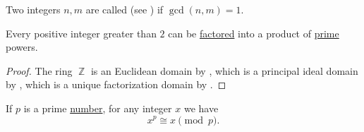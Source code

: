 \begin{definition}\label{def:coprime_numbers}
  Two integers \( n, m \) are called  (see ) if \( \gcd(n, m) = 1 \).
\end{definition}

\begin{theorem}\label{thm:fundamental_theorem_of_arithmetic}
  Every positive integer greater than \( 2 \) can be \hyperref[def:factorization_in_ring]{factored} into a product of \hyperref[def:prime_number]{prime} powers.
\end{theorem}
\begin{proof}
  The ring \( \BbbZ \) is an Euclidean domain by , which is a principal ideal domain by , which is a unique factorization domain by .
\end{proof}

\begin{proposition}\label{thm:fermats_little_theorem}
  If \( p \) is a prime \hyperref[def:prime_number]{number}, for any integer \( x \) we have
  \begin{equation*}
    x^p \cong x \pmod p.
  \end{equation*}
\end{proposition}
